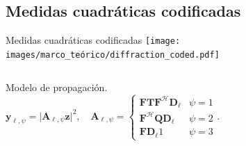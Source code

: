 \documentclass[aspectratio=169,t,xcolor=table]{beamer}
\begin{document}
\subsection{Medidas cuadráticas codificadas}

\begin{frame}{Medidas cuadráticas codificadas}
\scriptsize
\centering\vspace{-4mm}
        \texttt{[image: images/marco\_teórico/diffraction\_coded.pdf]}\vspace{-3mm}
    \begin{columns}
        
       \begin{block}{\scriptsize  Modelo de propagación.}
        \vspace{-1cm}
        \begin{equation}
             \mathbf{y}_{\ell, \psi} = \vert \mathbf{A}_{\ell, \psi}\mathbf{z} \vert^2, \quad \mathbf{A}_{\ell,\psi}= \left\{\begin{matrix} \mathbf{F}\mathbf{T}\mathbf{F}^\mathcal{H} \mathbf{D}_\ell  & \psi=1\\                 \mathbf{F}^\mathcal{H}\mathbf{Q}\mathbf{D}_\ell & \psi=2 \\ 
                \mathbf{F}\mathbf{D}_\ell1  &\psi=3
                \end{matrix}\right..
            \label{eq:diffraction_base}
        \end{equation}


\end{block}
\end{columns}
\end{frame}
\end{document}

